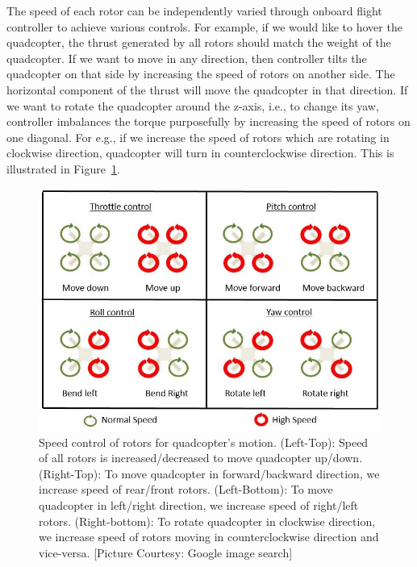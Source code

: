 The speed of each rotor can be independently varied through onboard flight
controller to achieve various controls. For example, if we would like to hover
the quadcopter, the thrust generated by all rotors should match the weight of the
quadcopter. If we want to move in any direction, then controller tilts the
quadcopter on that side by increasing the speed of rotors on another side. The
horizontal component of the thrust will move the quadcopter in that direction.
If we want to rotate the quadcopter around the z-axis, i.e., to change its yaw,
controller imbalances the torque purposefully by increasing the speed of rotors on
one diagonal. For e.g., if we increase the speed of rotors which are rotating in
clockwise direction, quadcopter will turn in counterclockwise direction.
This is illustrated in Figure~\ref{fig:quadcopterMotion}.

\begin{figure}[h!]
  \includegraphics[width=\textwidth]{images/quadcopterMotion.jpg}
  \caption[Speed control of rotors for quadcopter's motion]{Speed control of
  rotors for quadcopter's motion.
  (Left-Top): Speed of all rotors is increased/decreased to move
  quadcopter up/down.
  (Right-Top): To move quadcopter in forward/backward direction, we increase
  speed of rear/front rotors.
  (Left-Bottom): To move quadcopter in left/right direction, we increase
  speed of right/left rotors.
  (Right-bottom): To rotate quadcopter in clockwise direction, we increase speed
  of rotors moving in counterclockwise direction and vice-versa. 
   [Picture Courtesy: Google image search]}
  \label{fig:quadcopterMotion}	
\end{figure}

